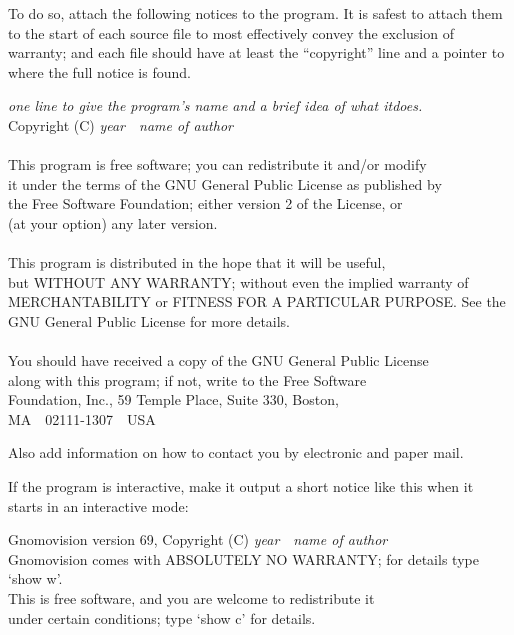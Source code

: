 \documentclass{uw-wkrpt}
\begin{document}
\begin{singlespacing}
  To do so, attach the following notices to the program.  It is safest
to attach them to the start of each source file to most effectively
convey the exclusion of warranty; and each file should have at least
the ``copyright'' line and a pointer to where the full notice is found.
\renewenvironment{quote}{\list{}{}\item\relax}{\endlist}
\begin{quote}\ttfamily\footnotesize
    \emph{one line to give the program's name and a brief 
    idea of what it\nolinebreak[4] does.}\\
    Copyright (C) \emph{year}\ \ \emph{name of author}\\
\mbox{}\\
    This program is free software; you can redistribute it and/or modify\\
    it under the terms of the GNU General Public License as published by\\
    the Free Software Foundation; either version 2 of the License, or\\
    (at your option) any later version.\\
\mbox{}\\
    This program is distributed in the hope that it will be useful,\\
    but WITHOUT ANY WARRANTY; without even the implied warranty of\\
    MERCHANTABILITY or FITNESS FOR A PARTICULAR PURPOSE.  See the\\
    GNU General Public License for more details.\\
\mbox{}\\
    You should have received a copy of the GNU General Public License\\
    along with this program; if not, write to the Free Software\\
    Foundation, Inc., 59 Temple Place, Suite 330, Boston, \\
    MA\ \ 02111-1307\ \ USA
\end{quote}


Also add information on how to contact you by electronic and paper mail.

If the program is interactive, make it output a short notice like this
when it starts in an interactive mode:
\begin{quote}\ttfamily\footnotesize
    Gnomovision version 69, Copyright (C) \emph{year}\ \ 
    \emph{name of author}\\
    Gnomovision comes with ABSOLUTELY NO WARRANTY; for details type `show w'.\\
    This is free software, and you are welcome to redistribute it\\
    under certain conditions; type `show c' for details.
\end{quote}


\end{singlespacing}
\end{document}
